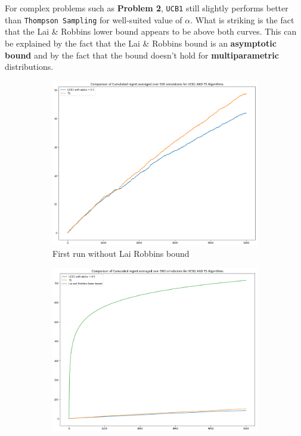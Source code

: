 \documentclass[11pt]{article}
\numberwithin{figure}{section} %
\begin{document}
For complex problems such as \textbf{Problem 2}, \texttt{UCB1} still slightly performs better than \texttt{Thompson Sampling} for well-suited value of $\alpha$. What is striking is the fact that the Lai \& Robbins lower bound appears to be above both curves. This can be explained by the fact that the Lai \& Robbins bound is an \textbf{asymptotic bound} and by the fact that the bound doesn't hold for \textbf{multiparametric} distributions.

\begin{figure}[H]
    \centering
    \begin{subfigure}{.5\textwidth}
        \centering
        \includegraphics[width=1\linewidth]{images/hard_ucb_v_ts_nolr}
        \caption{First run without Lai Robbins bound}
        \label{fig:hard_without_lr}
    \end{subfigure}%
    \begin{subfigure}{.5\textwidth}
        \centering
        \includegraphics[width=1\linewidth]{images/hard_ucb_v_ts}

\end{subfigure}
\end{figure}
\end{document}
